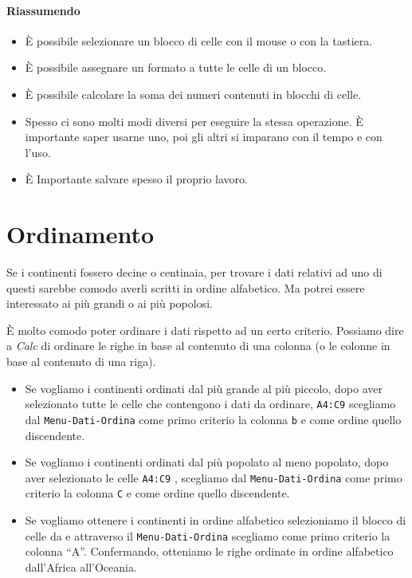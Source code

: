 \salvare[0]

\paragraph{Riassumendo}

\begin{itemize} [nosep]
\item È possibile selezionare un blocco di celle con il mouse o con la tastiera.
\item È possibile assegnare un formato a tutte le celle di un blocco.
\item È possibile calcolare la soma dei numeri contenuti in blocchi di celle.
\item Spesso ci sono molti modi diversi per eseguire la stessa operazione.
È importante saper usarne uno, poi gli altri si imparano con il tempo e
con l'uso.
\item È Importante salvare spesso il proprio lavoro.
\end{itemize}

\section{Ordinamento}
\label{fogliodicalcolo:ordinamenti}

Se i continenti fossero decine o centinaia, per trovare i dati relativi ad
uno di questi sarebbe comodo averli scritti in ordine alfabetico.
Ma potrei essere interessato ai più grandi o ai più popolosi.

È molto comodo poter ordinare i dati rispetto ad un certo criterio.
Possiamo dire a \emph{Calc} di ordinare le righe in base al contenuto di una 
colonna (o le colonne in base al contenuto di una riga).
\begin{itemize} [nosep]
\item 
Se vogliamo i continenti ordinati dal più grande al più piccolo, 
dopo aver selezionato tutte le celle che contengono i dati da ordinare, 
\texttt{A4:C9} 
scegliamo dal \texttt{Menu-Dati-Ordina} come primo criterio la colonna 
\texttt{b} e come ordine quello discendente.
\item 
Se vogliamo i continenti ordinati dal più popolato al meno popolato, 
dopo aver selezionato le celle \texttt{A4:C9} ,
scegliamo dal \texttt{Menu-Dati-Ordina} come primo criterio la colonna 
\texttt{C} e come ordine quello discendente.
\item 
Se vogliamo ottenere i continenti in ordine alfabetico selezioniamo il blocco
di celle da e attraverso il \texttt{Menu-Dati-Ordina} 
scegliamo come primo criterio la colonna ``A''.
Confermando, otteniamo le righe ordinate in ordine alfabetico dall'Africa
all'Oceania.
\end{itemize}

